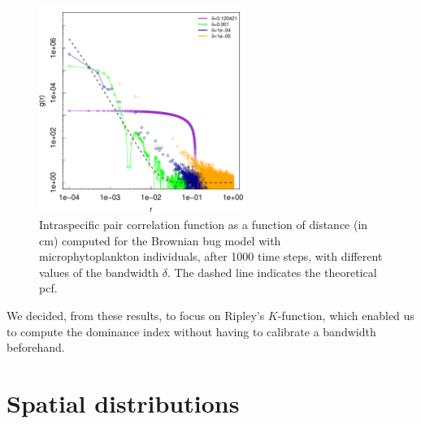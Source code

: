 \documentclass[english]{article}
\begin{document}
\begin{figure}[H]
\begin{centering}
\includegraphics[width=0.6\textwidth]{../code/figure/bandwidth_BBM}
\par\end{centering}
\caption{Intraspecific pair correlation function as a function of distance
(in cm) computed for the Brownian bug model with microphytoplankton
individuals, after 1000 time steps, with different values of the bandwidth
$\delta$. The dashed line indicates the theoretical pcf.\label{fig:bandwidth_BBM}
}
\end{figure}

We decided, from these results, to focus on Ripley's $K$-function,
which enabled us to compute the dominance index without having to
calibrate a bandwidth beforehand. 

\section{Spatial distributions}
\end{document}
